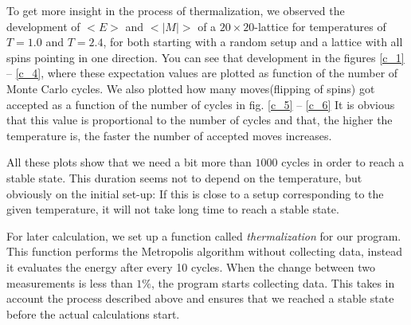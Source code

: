 \documentclass[10pt,a4paper]{article}
\begin{document}
To get more insight in the process of thermalization, we observed the development of $<E>$ and $<|M|>$ of a $20\times20$-lattice for temperatures of $T=1.0$ and $T=2.4$, for both starting with a random setup and a lattice with all spins pointing in one direction. You can see that development in the figures \ref{c_1} -- \ref{c_4}, where these expectation values are plotted as function of the number of Monte Carlo cycles. We also plotted how many \glq moves\grq (flipping of spins) got accepted as a function of the number of cycles in fig. \ref{c_5} -- \ref{c_6} It is obvious that this value is proportional to the number of cycles and that, the higher the temperature is, the faster the number of accepted moves increases.

All these plots show that we need a bit more than $1000$ cycles in order to reach a stable state. This duration seems not to depend on the temperature, but obviously on the initial set-up: If this is close to a setup corresponding to the given temperature, it will not take long time to reach a stable state.



\label{results}
For later calculation, we set up a function called \emph{thermalization} for our program. This function performs the Metropolis algorithm without collecting data, instead it evaluates the energy after every 10 cycles. When the change between two measurements is less than $1\%$, the program starts collecting data. This takes in account the process described above and ensures that we reached a stable state before the actual calculations start.
\end{document}
